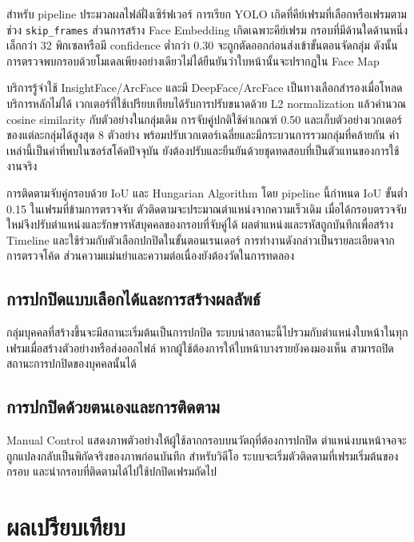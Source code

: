 สำหรับ pipeline ประมวลผลไฟล์ฝั่งเซิร์ฟเวอร์ การเรียก YOLO เกิดที่คีย์เฟรมที่เลือกหรือเฟรมตามช่วง \texttt{skip\_frames} ส่วนการสร้าง Face Embedding เกิดเฉพาะคีย์เฟรม กรอบที่มีด้านใดด้านหนึ่งเล็กกว่า 32 พิกเซลหรือมี confidence ต่ำกว่า 0.30 จะถูกตัดออกก่อนส่งเข้าขั้นตอนจัดกลุ่ม ดังนั้นการตรวจพบกรอบด้วยโมเดลเพียงอย่างเดียวไม่ได้ยืนยันว่าใบหน้านั้นจะปรากฏใน Face Map

บริการรู้จำใช้ InsightFace/ArcFace และมี DeepFace/ArcFace เป็นทางเลือกสำรองเมื่อโหลดบริการหลักไม่ได้ เวกเตอร์ที่ใช้เปรียบเทียบได้รับการปรับขนาดด้วย L2 normalization แล้วคำนวณ cosine similarity กับตัวอย่างในกลุ่มเดิม การจับคู่ปกติใช้ค่าเกณฑ์ 0.50 และเก็บตัวอย่างเวกเตอร์ของแต่ละกลุ่มได้สูงสุด 8 ตัวอย่าง พร้อมปรับเวกเตอร์เฉลี่ยและมีกระบวนการรวมกลุ่มที่คล้ายกัน ค่าเหล่านี้เป็นค่าที่พบในซอร์สโค้ดปัจจุบัน ยังต้องปรับและยืนยันด้วยชุดทดสอบที่เป็นตัวแทนของการใช้งานจริง

การติดตามจับคู่กรอบด้วย IoU และ Hungarian Algorithm โดย pipeline นี้กำหนด IoU ขั้นต่ำ 0.15 ในเฟรมที่ข้ามการตรวจจับ ตัวติดตามจะประมาณตำแหน่งจากความเร็วเดิม เมื่อได้กรอบตรวจจับใหม่จึงปรับตำแหน่งและรักษารหัสบุคคลของกรอบที่จับคู่ได้ ผลตำแหน่งและรหัสถูกบันทึกเพื่อสร้าง Timeline และใช้ร่วมกับตัวเลือกปกปิดในขั้นตอนเรนเดอร์ การทำงานดังกล่าวเป็นรายละเอียดจากการตรวจโค้ด ส่วนความแม่นยำและความต่อเนื่องยังต้องวัดในการทดลอง

\subsection{การปกปิดแบบเลือกได้และการสร้างผลลัพธ์}

กลุ่มบุคคลที่สร้างขึ้นจะมีสถานะเริ่มต้นเป็นการปกปิด ระบบนำสถานะนี้ไปรวมกับตำแหน่งใบหน้าในทุกเฟรมเมื่อสร้างตัวอย่างหรือส่งออกไฟล์ หากผู้ใช้ต้องการให้ใบหน้าบางรายยังคงมองเห็น สามารถปิดสถานะการปกปิดของบุคคลนั้นได้

\subsection{การปกปิดด้วยตนเองและการติดตาม}

Manual Control แสดงภาพตัวอย่างให้ผู้ใช้ลากกรอบบนวัตถุที่ต้องการปกปิด ตำแหน่งบนหน้าจอจะถูกแปลงกลับเป็นพิกัดจริงของภาพก่อนบันทึก สำหรับวิดีโอ ระบบจะเริ่มตัวติดตามที่เฟรมเริ่มต้นของกรอบ และนำกรอบที่ติดตามได้ไปใช้ปกปิดเฟรมถัดไป

\clearpage

\section{ผลเปรียบเทียบ}

